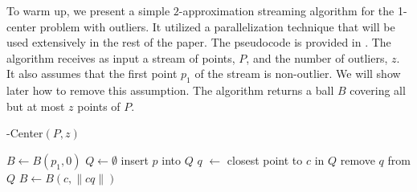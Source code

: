 \documentclass[envcountsame]{cls/cccg15}
\DeclareMathOperator*{\argmin}{arg\,min}
\newcommand{\textproc}{\textsc}
\newcommand{\Call}[2]{\textsc{#1}(#2)}
\newcommand{\set}[1]{\left\{ #1 \right\}}
\newcommand{\len}[1]{\|{#1}\|}
\begin{document}
To warm up, we present a simple $2$-approximation streaming algorithm
for the 1-center problem with outliers.
It utilized a parallelization technique that 
will be used extensively in the rest of the paper.
The pseudocode is provided in .
The algorithm receives as input a stream of points, $P$,
and the number of outliers, $z$.
It also assumes that the first point $p_1$ of the stream is non-outlier.
We will show later how to remove this assumption.
The algorithm returns a ball $B$ covering all but at most $z$ points of $P$.
%

%
%

\begin{algorithm}
\caption{-Center$(P, z)$} 
\label{alg:1-center}
\begin{algorithmic}[1]
	\STATE $B \gets B(p_1, 0)$
	\STATE $Q \gets \emptyset$
			\STATE insert $p$ into $Q$
				\STATE $q$ $\gets$ closest point to $c$ in $Q$
				\STATE remove $q$ from $Q$
				\STATE $B \gets B(c, \len{cq})$
			\ENDIF
		\ENDIF
	\ENDFOR
\end{algorithmic}
\end{algorithm}

\end{document}
